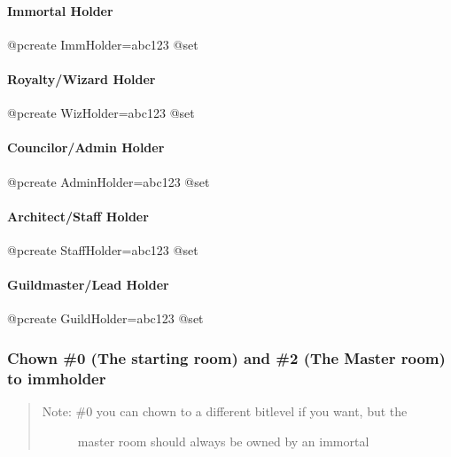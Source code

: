 \documentclass[letterpaper,10pt,english]{sphinxmanual}
\begin{document}
\paragraph{Immortal Holder}
\label{\detokenize{gettingstarted:immortal-holder}}
\sphinxAtStartPar
@pcreate ImmHolder=abc123
@set 


\paragraph{Royalty/Wizard Holder}
\label{\detokenize{gettingstarted:royalty-wizard-holder}}
\sphinxAtStartPar
@pcreate WizHolder=abc123
@set 


\paragraph{Councilor/Admin Holder}
\label{\detokenize{gettingstarted:councilor-admin-holder}}
\sphinxAtStartPar
@pcreate AdminHolder=abc123
@set 


\paragraph{Architect/Staff Holder}
\label{\detokenize{gettingstarted:architect-staff-holder}}
\sphinxAtStartPar
@pcreate StaffHolder=abc123
@set 


\paragraph{Guildmaster/Lead Holder}
\label{\detokenize{gettingstarted:guildmaster-lead-holder}}
\sphinxAtStartPar
@pcreate GuildHolder=abc123
@set 


\subsubsection{Chown \#0 (The starting room) and \#2 (The Master room) to immholder}
\label{\detokenize{gettingstarted:chown-0-the-starting-room-and-2-the-master-room-to-immholder}}\begin{quote}
\begin{description}
\item[{Note: \#0 you can chown to a different bitlevel if you want, but the}] \leavevmode
\sphinxAtStartPar
master room should always be owned by an immortal

\end{description}
\end{quote}
\end{document}
